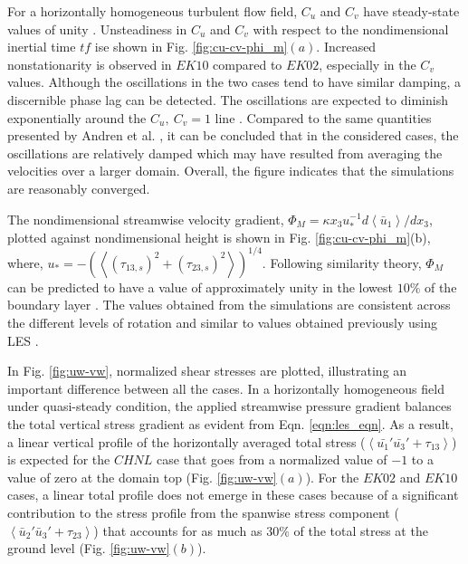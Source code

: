 \noindent For a horizontally homogeneous turbulent flow field, $C_u$ and $C_v$ have steady-state values of unity  \cite{book-garrat-blm}. Unsteadiness in $C_u$ and $C_v$ with respect to the nondimensional inertial time $tf$ ise shown in Fig.  \ref{fig:cu-cv-phi_m}$(a)$. Increased nonstationarity is observed in $EK10$ compared to $EK02$, especially in the $C_v$ values. Although the oscillations in the two cases tend to have similar damping, a discernible phase lag can be detected. The oscillations are expected to diminish  exponentially around the  $C_{u},\ C_{v}=1$ line \cite{book-garrat-blm}. Compared to the same quantities presented by Andren et al.  \cite{andren_brown_qjrm_94}, it can be concluded that in the considered cases, the oscillations are relatively damped which may have resulted from averaging the velocities over a larger domain. Overall, the figure indicates that the simulations are reasonably converged. 

The nondimensional streamwise velocity gradient, $\Phi_M=\kappa x_3 u_*^{-1} d\left < \bar{u}_1 \right >/dx_3$, plotted against nondimensional height is shown in Fig. \ref{fig:cu-cv-phi_m}(b), where, $u_*= -(\left < (\tau_{13,s})^2 + ( \tau_{23,s})^2\right >)^{1/4}$. Following similarity theory, $\Phi_M$ can be predicted to have a value of approximately unity in the lowest $10\%$ of the boundary layer \cite{book-garrat-blm, stoll_blm_2006}. The values obtained from the simulations are consistent across the different levels of rotation and similar to values obtained previously using LES \cite{stoll_blm_2006,Bouzeid_pof_2005,andren_brown_qjrm_94}. 

In Fig. \ref{fig:uw-vw}, normalized shear stresses are plotted, illustrating an important difference between all the cases. In a horizontally homogeneous field under quasi-steady condition, the applied streamwise pressure gradient balances the total vertical stress gradient as evident from Eqn. \ref{eqn:les_eqn}. As a result, a linear vertical profile of the horizontally averaged total stress ($\left <\bar{u_1}'\bar{u_3}'+\tau_{13} \right>$)  is expected for the $CHNL$ case that goes from a normalized value of $-1$ to a value of zero at the domain top (Fig. \ref{fig:uw-vw}$(a)$). For the $EK02$ and $EK10$ cases, a linear total profile does not emerge in these cases because of a significant contribution to the stress profile from  the spanwise stress component ($\left <\bar{u}_{2}'\bar{u}_{3}'+\tau_{23} \right>$) that accounts for as much as $30\%$ of the total stress at the ground level (Fig. \ref{fig:uw-vw}$(b)$). 

